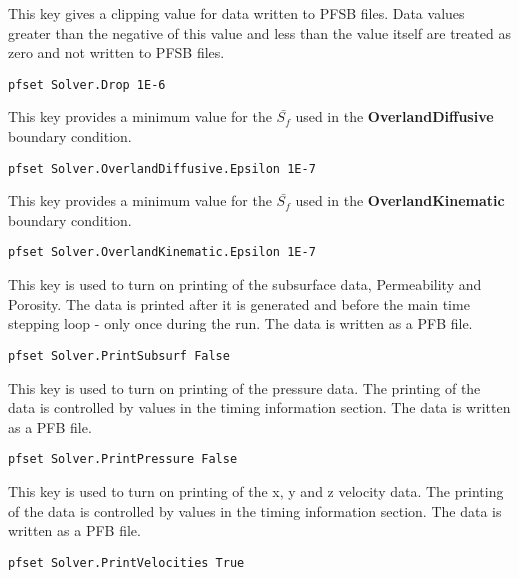 {
This key gives a clipping value for data written to PFSB
files.  Data values greater than the negative of this
value and less than the value itself are treated as zero
and not written to PFSB files.
}
\begin{display}\begin{verbatim}
pfset Solver.Drop 1E-6
\end{verbatim}\end{display}

{
This key provides a minimum value for the $\bar{S_{f}}$ used in the {\bf OverlandDiffusive} boundary condition.
}
\begin{display}\begin{verbatim}
pfset Solver.OverlandDiffusive.Epsilon 1E-7
\end{verbatim}\end{display}

{
This key provides a minimum value for the $\bar{S_{f}}$ used in the {\bf OverlandKinematic} boundary condition.
}
\begin{display}\begin{verbatim}
pfset Solver.OverlandKinematic.Epsilon 1E-7
\end{verbatim}\end{display}

{
This key is used to turn on printing of the subsurface data,
Permeability and Porosity.  The data is printed after it is
generated and before the main time stepping loop - only once
during the run.  The data is written as a PFB file.
}
\begin{display}\begin{verbatim}
pfset Solver.PrintSubsurf False
\end{verbatim}\end{display}

{
This key is used to turn on printing of the pressure data.
The printing of the data is controlled by values in the
timing information section.  The data is written as a PFB
file.
}
\begin{display}\begin{verbatim}
pfset Solver.PrintPressure False
\end{verbatim}\end{display}

{
This key is used to turn on printing of the x, y and z
velocity data.  The printing of the data is controlled by
values in the timing information section.  The data is
written as a PFB file.
}
\begin{display}\begin{verbatim}
pfset Solver.PrintVelocities True
\end{verbatim}\end{display}


